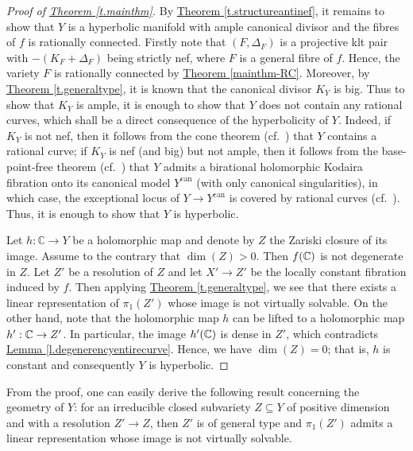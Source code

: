 \begin{proof}[Proof of {\hyperref[t.mainthm]{Theorem \ref*{t.mainthm}}}]
	By {\hyperref[t.structureantinef]{Theorem \ref*{t.structureantinef}}}, it remains to show that $Y$ is a hyperbolic manifold with ample canonical divisor and the fibres of $f$ is rationally connected. 
	Firstly note that $(F,\Delta_F)$ is a  projective klt pair with $-(K_F+\Delta_F)$ being strictly nef, where $F$ is a general fibre of $f$. 
	Hence, the variety $F$ is rationally connected by {\hyperref[mainthm-RC]{Theorem \ref*{mainthm-RC}}}. Moreover, by {\hyperref[t.generaltype]{Theorem  \ref*{t.generaltype}}}, it is known that the canonical divisor $K_Y$ is big. 
	Thus to show that $K_Y$ is ample, it is enough to show that $Y$ does not contain any rational curves, 
	which shall be a direct consequence of the hyperbolicity of $Y$. 
	Indeed, if $K_Y$ is not nef, then it follows from the cone theorem (cf.~\cite[Theorem 3.7]{KM98}) that $Y$ contains a rational curve; if $K_Y$ is nef (and big) but not ample, then it follows from the base-point-free theorem (cf.~\cite[Theorem 3.3]{KM98}) that $Y$ admits a birational holomorphic Kodaira fibration onto its canonical model $Y^{\text{can}}$ (with only canonical singularities), in which case, the exceptional locus of $Y\to Y^{\text{can}}$ is covered by rational curves (cf.~\cite[Proof of Proposition 1.3]{KM98}). 
Thus, it is enough to show that $Y$ is hyperbolic.
	
	Let $h:\mathbb{C}\rightarrow Y$ be a holomorphic map and denote by $Z$ the Zariski closure of its image. Assume to the contrary that $\dim(Z)>0$. Then $f(\mathbb C)$ is not degenerate in $Z$. Let $Z'$ be a resolution of $Z$ and let $X'\rightarrow Z'$ be the locally constant fibration induced by $f$. Then applying {\hyperref[t.generaltype]{Theorem  \ref*{t.generaltype}}}, we see that there exists a linear representation of $\pi_1(Z')$ whose image is not virtually solvable. 
	On the other hand, note that the holomorphic map $h$ can be lifted to a holomorphic map $h':\mathbb C\rightarrow Z'$. In particular, the image $h'(\mathbb C)$ is dense in $Z'$, which contradicts {\hyperref[l.degenerencyentirecurve]{Lemma  \ref*{l.degenerencyentirecurve}}}. Hence, we have $\dim(Z)=0$; that is, $h$ is constant and consequently $Y$ is hyperbolic.
\end{proof}

\begin{rmq}
	From the proof, one can easily derive the following result concerning   the geometry of $Y$: for an irreducible closed subvariety $Z\subseteq Y$ of positive dimension and with a resolution $Z'\rightarrow Z$, then $Z'$ is of general type and $\pi_1(Z')$ admits a linear representation whose image is not virtually solvable.
\end{rmq}

